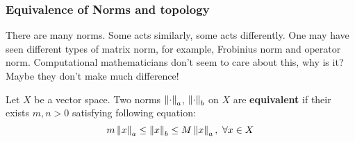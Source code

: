 \documentclass{article}
\begin{document}
\subsubsection{Equivalence of Norms and topology}
There are many norms. Some acts similarly, some acts differently. One may have seen different types of matrix norm, for example, Frobinius norm and operator norm. Computational mathematicians don't seem to care about this, why is it? Maybe they don't make much difference!
\begin{definition}\label{equivalent norms}\rm\nextline
	Let $X$ be a vector space. Two norms $\left\|{\cdot}\right\|_a$, $\left\|{\cdot}\right\|_b$ on $X$ are {\bf equivalent} if their exists $m,n>0$ satisfying following equation:
	$$
		m\left\|{x}\right\|_a\leq \left\|{x}\right\|_b\leq M\left\|{x}\right\|_a,\,\,\forall x\in X
	$$
\end{definition}
\end{document}
